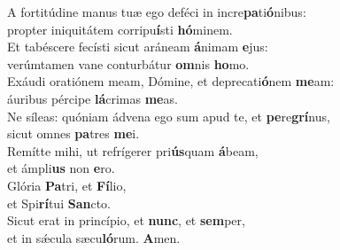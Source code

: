 \evenverse A fortitúdine manus tuæ ego deféci in incre\textbf{pa}ti\textbf{ó}nibus:~\*\\
\evenverse propter iniquitátem corripu\textbf{í}sti \textbf{hó}minem.\\
\oddverse Et tabéscere fecísti sicut aráneam \textbf{á}nimam \textbf{e}jus:~\*\\
\oddverse verúmtamen vane conturbátur \textbf{om}nis \textbf{ho}mo.\\
\evenverse Exáudi oratiónem meam, Dómine, et deprecati\textbf{ó}nem \textbf{me}am:~\*\\
\evenverse áuribus pércipe \textbf{lá}crimas \textbf{me}as.\\
\oddverse Ne síleas: quóniam ádvena ego sum apud te, et \textbf{pe}re\textbf{grí}nus,~\*\\
\oddverse sicut omnes \textbf{pa}tres \textbf{me}i.\\
\evenverse Remítte mihi, ut refrígerer pri\textbf{ús}quam \textbf{á}beam,~\*\\
\evenverse et ámpli\textbf{us} non \textbf{e}ro.\\
\oddverse Glória \textbf{Pa}tri, et \textbf{Fí}lio,~\*\\
\oddverse et Spi\textbf{rí}tui \textbf{San}cto.\\
\evenverse Sicut erat in princípio, et \textbf{nunc}, et \textbf{sem}per,~\*\\
\evenverse et in sǽcula sæcu\textbf{ló}rum. \textbf{A}men.\\
